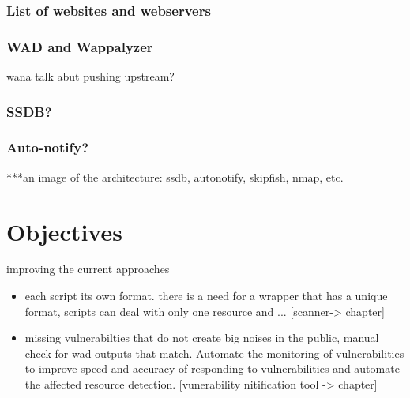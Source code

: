 \subsubsection{List of websites and webservers}
\subsubsection{WAD and Wappalyzer}
\label{wad_section}
wana talk abut pushing upstream?
\subsubsection{SSDB?}
\subsubsection{Auto-notify?}

***an image of the architecture: ssdb, autonotify, skipfish, nmap, etc.


\section{Objectives}
improving the current approaches
\begin{itemize}
\item each script its own format. there is a need for a wrapper that has a unique format, scripts can deal with only one resource and ... [scanner-> chapter]
\item missing vulnerabilties that do not create big noises in the public, manual check for wad outputs that match. Automate the monitoring of vulnerabilities to improve speed and accuracy of responding to vulnerabilities and automate the affected resource detection. [vunerability nitification tool -> chapter]
\end{itemize}

























